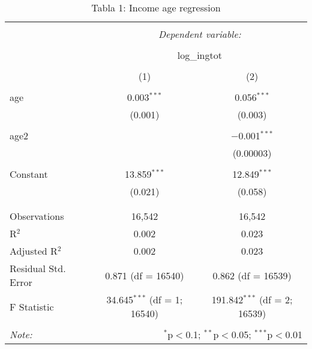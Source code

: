 
\begin{table}[!htbp] \centering 
  \caption{Tabla 1: Income age regression} 
  \label{} 
\begin{tabular}{@{\extracolsep{5pt}}lcc} 
\\[-1.8ex]\hline 
\hline \\[-1.8ex] 
 & \multicolumn{2}{c}{\textit{Dependent variable:}} \\ 
\cline{2-3} 
\\[-1.8ex] & \multicolumn{2}{c}{log\_ingtot} \\ 
\\[-1.8ex] & (1) & (2)\\ 
\hline \\[-1.8ex] 
 age & 0.003$^{***}$ & 0.056$^{***}$ \\ 
  & (0.001) & (0.003) \\ 
  & & \\ 
 age2 &  & $-$0.001$^{***}$ \\ 
  &  & (0.00003) \\ 
  & & \\ 
 Constant & 13.859$^{***}$ & 12.849$^{***}$ \\ 
  & (0.021) & (0.058) \\ 
  & & \\ 
\hline \\[-1.8ex] 
Observations & 16,542 & 16,542 \\ 
R$^{2}$ & 0.002 & 0.023 \\ 
Adjusted R$^{2}$ & 0.002 & 0.023 \\ 
Residual Std. Error & 0.871 (df = 16540) & 0.862 (df = 16539) \\ 
F Statistic & 34.645$^{***}$ (df = 1; 16540) & 191.842$^{***}$ (df = 2; 16539) \\ 
\hline 
\hline \\[-1.8ex] 
\textit{Note:}  & \multicolumn{2}{r}{$^{*}$p$<$0.1; $^{**}$p$<$0.05; $^{***}$p$<$0.01} \\ 
\end{tabular} 
\end{table} 
